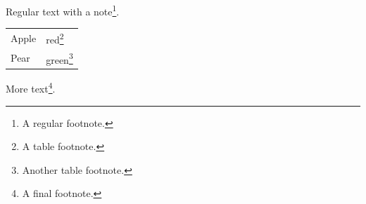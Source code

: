 \documentclass{article}
\begin{document}
Regular text with a note\footnote{A regular footnote.}.
\begin{tabular}{ll}
Apple & red\footnote{A table footnote.} \\
Pear & green\footnote{Another table footnote.} \\
\end{tabular}
More text\footnote{A final footnote.}.
\end{document}
